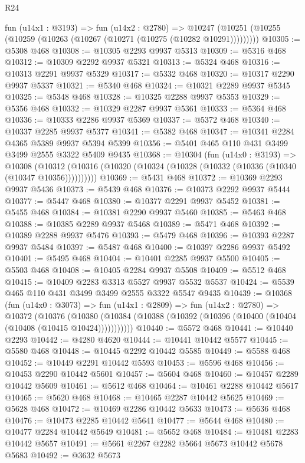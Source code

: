 \begin{lexlean}{R24}
\begin{coremodule}
    fun (u14x1 : @3193) =>
    fun (u14x2 : @2780) =>
    @10247 (@10251 (@10255 (@10259 (@10263 (@10267 (@10271 (@10275 (@10282 @10291)))))))))
@10305 := @5308 @468
@10308 := @10305 @2293 @9937 @5313
@10309 := @5316 @468
@10312 := @10309 @2292 @9937 @5321
@10313 := @5324 @468
@10316 := @10313 @2291 @9937 @5329
@10317 := @5332 @468
@10320 := @10317 @2290 @9937 @5337
@10321 := @5340 @468
@10324 := @10321 @2289 @9937 @5345
@10325 := @5348 @468
@10328 := @10325 @2288 @9937 @5353
@10329 := @5356 @468
@10332 := @10329 @2287 @9937 @5361
@10333 := @5364 @468
@10336 := @10333 @2286 @9937 @5369
@10337 := @5372 @468
@10340 := @10337 @2285 @9937 @5377
@10341 := @5382 @468
@10347 := @10341 @2284 @4365 @5389 @9937 @5394 @5399
@10356 := @5401 @465 @110 @431 @3499 @3499 @2555 @3322 @5409 @9435
@10368 := @10304
    (fun (u14x0 : @3193) =>
    @10308 (@10312 (@10316 (@10320 (@10324 (@10328 (@10332 (@10336 (@10340 (@10347 @10356))))))))))
@10369 := @5431 @468
@10372 := @10369 @2293 @9937 @5436
@10373 := @5439 @468
@10376 := @10373 @2292 @9937 @5444
@10377 := @5447 @468
@10380 := @10377 @2291 @9937 @5452
@10381 := @5455 @468
@10384 := @10381 @2290 @9937 @5460
@10385 := @5463 @468
@10388 := @10385 @2289 @9937 @5468
@10389 := @5471 @468
@10392 := @10389 @2288 @9937 @5476
@10393 := @5479 @468
@10396 := @10393 @2287 @9937 @5484
@10397 := @5487 @468
@10400 := @10397 @2286 @9937 @5492
@10401 := @5495 @468
@10404 := @10401 @2285 @9937 @5500
@10405 := @5503 @468
@10408 := @10405 @2284 @9937 @5508
@10409 := @5512 @468
@10415 := @10409 @2283 @3313 @5527 @9937 @5532 @5537
@10424 := @5539 @465 @110 @431 @3499 @3499 @2555 @3322 @5547 @9435
@10439 := @10368
    (fun (u14x0 : @3073) =>
    fun (u14x1 : @2809) =>
    fun (u14x2 : @2780) =>
    @10372
      (@10376
        (@10380 (@10384 (@10388 (@10392 (@10396 (@10400 (@10404 (@10408 (@10415 @10424)))))))))))
@10440 := @5572 @468
@10441 := @10440 @2293
@10442 := @4280 @4620
@10444 := @10441 @10442 @5577
@10445 := @5580 @468
@10448 := @10445 @2292 @10442 @5585
@10449 := @5588 @468
@10452 := @10449 @2291 @10442 @5593
@10453 := @5596 @468
@10456 := @10453 @2290 @10442 @5601
@10457 := @5604 @468
@10460 := @10457 @2289 @10442 @5609
@10461 := @5612 @468
@10464 := @10461 @2288 @10442 @5617
@10465 := @5620 @468
@10468 := @10465 @2287 @10442 @5625
@10469 := @5628 @468
@10472 := @10469 @2286 @10442 @5633
@10473 := @5636 @468
@10476 := @10473 @2285 @10442 @5641
@10477 := @5644 @468
@10480 := @10477 @2284 @10442 @5649
@10481 := @5652 @468
@10484 := @10481 @2283 @10442 @5657
@10491 := @5661 @2267 @2282 @5664 @5673 @10442 @5678 @5683
@10492 := @3632 @5673

\end{coremodule}
\end{lexlean}
